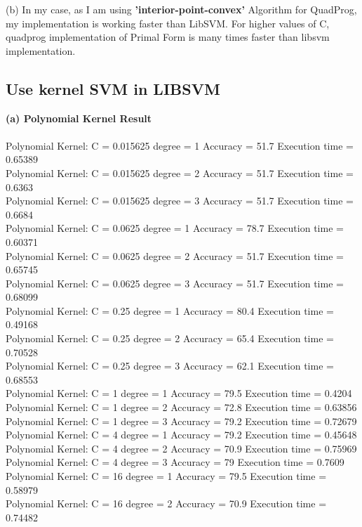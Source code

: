 \documentclass[paper=a4, fontsize=11pt]{scrartcl} %
\numberwithin{equation}{section} %
\numberwithin{figure}{section} %
\numberwithin{table}{section} %
\begin{document}
(b) In my case, as I am using \textbf{'interior-point-convex'} Algorithm for QuadProg, my implementation is working faster than LibSVM. For higher values of C, quadprog implementation of Primal Form is many times faster than libsvm implementation.


\subsection{Use kernel SVM in LIBSVM}

\textbf{(a) Polynomial Kernel Result}\\\\
Polynomial Kernel: C = 0.015625 degree = 1 Accuracy = 51.7 Execution time = 0.65389\\
Polynomial Kernel: C = 0.015625 degree = 2 Accuracy = 51.7 Execution time = 0.6363\\
Polynomial Kernel: C = 0.015625 degree = 3 Accuracy = 51.7 Execution time = 0.6684\\
Polynomial Kernel: C = 0.0625 degree = 1 Accuracy = 78.7 Execution time = 0.60371\\
Polynomial Kernel: C = 0.0625 degree = 2 Accuracy = 51.7 Execution time = 0.65745\\
Polynomial Kernel: C = 0.0625 degree = 3 Accuracy = 51.7 Execution time = 0.68099\\
Polynomial Kernel: C = 0.25 degree = 1 Accuracy = 80.4 Execution time = 0.49168\\
Polynomial Kernel: C = 0.25 degree = 2 Accuracy = 65.4 Execution time = 0.70528\\
Polynomial Kernel: C = 0.25 degree = 3 Accuracy = 62.1 Execution time = 0.68553\\
Polynomial Kernel: C = 1 degree = 1 Accuracy = 79.5 Execution time = 0.4204\\
Polynomial Kernel: C = 1 degree = 2 Accuracy = 72.8 Execution time = 0.63856\\
Polynomial Kernel: C = 1 degree = 3 Accuracy = 79.2 Execution time = 0.72679\\
Polynomial Kernel: C = 4 degree = 1 Accuracy = 79.2 Execution time = 0.45648\\
Polynomial Kernel: C = 4 degree = 2 Accuracy = 70.9 Execution time = 0.75969\\
Polynomial Kernel: C = 4 degree = 3 Accuracy = 79 Execution time = 0.7609\\
Polynomial Kernel: C = 16 degree = 1 Accuracy = 79.5 Execution time = 0.58979\\
Polynomial Kernel: C = 16 degree = 2 Accuracy = 70.9 Execution time = 0.74482\\
\end{document}
